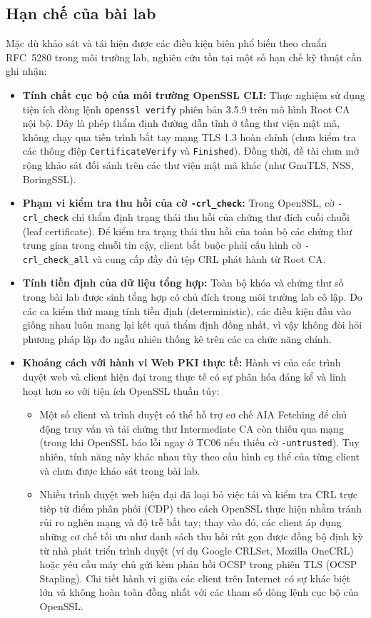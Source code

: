 \subsection{Hạn chế của bài lab}
\label{subsec:lab-limitations}
Mặc dù khảo sát và tái hiện được các điều kiện biên phổ biến theo chuẩn RFC~5280 trong môi trường lab, nghiên cứu tồn tại một số hạn chế kỹ thuật cần ghi nhận:
\begin{itemize}
    \item \textbf{Tính chất cục bộ của môi trường OpenSSL CLI:} Thực nghiệm sử dụng tiện ích dòng lệnh \texttt{openssl verify} phiên bản 3.5.9 trên mô hình Root CA nội bộ. Đây là phép thẩm định đường dẫn tĩnh ở tầng thư viện mật mã, không chạy qua tiến trình bắt tay mạng TLS 1.3 hoàn chỉnh (chưa kiểm tra các thông điệp \texttt{CertificateVerify} và \texttt{Finished}). Đồng thời, đề tài chưa mở rộng khảo sát đối sánh trên các thư viện mật mã khác (như GnuTLS, NSS, BoringSSL).
    \item \textbf{Phạm vi kiểm tra thu hồi của cờ \texttt{-crl\_check}:} Trong OpenSSL, cờ \texttt{-crl\_check} chỉ thẩm định trạng thái thu hồi của chứng thư đích cuối chuỗi (leaf certificate). Để kiểm tra trạng thái thu hồi của toàn bộ các chứng thư trung gian trong chuỗi tin cậy, client bắt buộc phải cấu hình cờ \texttt{-crl\_check\_all} và cung cấp đầy đủ tệp CRL phát hành từ Root CA.
    \item \textbf{Tính tiền định của dữ liệu tổng hợp:} Toàn bộ khóa và chứng thư số trong bài lab được sinh tổng hợp có chủ đích trong môi trường lab cô lập. Do các ca kiểm thử mang tính tiền định (deterministic), các điều kiện đầu vào giống nhau luôn mang lại kết quả thẩm định đồng nhất, vì vậy không đòi hỏi phương pháp lặp đo ngẫu nhiên thống kê trên các ca chức năng chính.
    \item \textbf{Khoảng cách với hành vi Web PKI thực tế:} Hành vi của các trình duyệt web và client hiện đại trong thực tế có sự phân hóa đáng kể và linh hoạt hơn so với tiện ích OpenSSL thuần túy:
    \begin{itemize}
        \item Một số client và trình duyệt có thể hỗ trợ cơ chế AIA Fetching để chủ động truy vấn và tải chứng thư Intermediate CA còn thiếu qua mạng (trong khi OpenSSL báo lỗi ngay ở TC06 nếu thiếu cờ \texttt{-untrusted}). Tuy nhiên, tính năng này khác nhau tùy theo cấu hình cụ thể của từng client và chưa được khảo sát trong bài lab.
        \item Nhiều trình duyệt web hiện đại đã loại bỏ việc tải và kiểm tra CRL trực tiếp từ điểm phân phối (CDP) theo cách OpenSSL thực hiện nhằm tránh rủi ro nghẽn mạng và độ trễ bắt tay; thay vào đó, các client áp dụng những cơ chế tối ưu như danh sách thu hồi rút gọn được đồng bộ định kỳ từ nhà phát triển trình duyệt (ví dụ Google CRLSet, Mozilla OneCRL) hoặc yêu cầu máy chủ gửi kèm phản hồi OCSP trong phiên TLS (OCSP Stapling). Chi tiết hành vi giữa các client trên Internet có sự khác biệt lớn và không hoàn toàn đồng nhất với các tham số dòng lệnh cục bộ của OpenSSL.
    \end{itemize}
\end{itemize}

